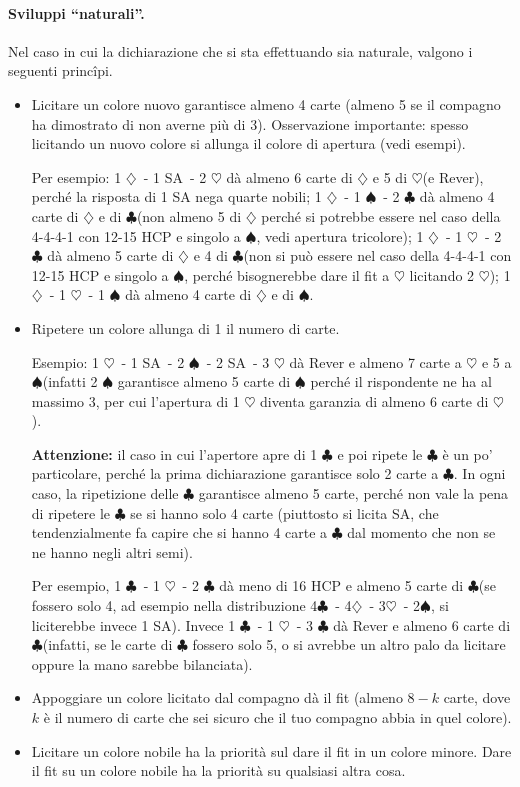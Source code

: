 \documentclass[a4paper,10pt]{article}
\renewcommand{\c}{$\clubsuit$\xspace}
\renewcommand{\d}{$\diamondsuit$\xspace}
\newcommand{\h}{$\heartsuit$\xspace}
\newcommand{\s}{$\spadesuit$\xspace}
\newcommand{\sa}{SA\xspace}
\begin{document}
\paragraph{Sviluppi ``naturali''.}
Nel caso in cui la dichiarazione che si sta effettuando sia naturale, valgono i seguenti princ\^ipi.
\begin{itemize}
 \item Licitare un colore nuovo garantisce almeno 4 carte (almeno 5 se il compagno ha dimostrato di non averne più di 3). Osservazione importante: spesso licitando un nuovo colore si allunga il colore di apertura (vedi esempi).
 
 Per esempio: 1 \d\ - 1 \sa\ - 2 \h dà almeno 6 carte di \d e 5 di \h (e Rever), perché la risposta di 1 \sa nega quarte nobili;
 1 \d\ - 1 \s\ - 2 \c dà almeno 4 carte di \d e di \c (non almeno 5 di \d perché si potrebbe essere nel caso della 4-4-4-1 con 12-15 HCP e singolo a \s, vedi apertura tricolore);
 1 \d\ - 1 \h\ - 2 \c dà almeno 5 carte di \d e 4 di \c (non si può essere nel caso della 4-4-4-1 con 12-15 HCP e singolo a \s, perché bisognerebbe dare il fit a \h licitando 2 \h);
 1 \d\ - 1 \h\ - 1 \s dà almeno 4 carte di \d e di \s.
 
 \item Ripetere un colore allunga di 1 il numero di carte.
 
 Esempio: 1 \h\ - 1 \sa\ - 2 \s\ - 2 \sa\ - 3 \h dà Rever e almeno 7 carte a \h e 5 a \s (infatti 2 \s garantisce almeno 5 carte di \s perché il rispondente ne ha al massimo 3, per cui l'apertura di 1 \h diventa garanzia di almeno 6 carte di \h).
 
 {\bf Attenzione:} il caso in cui l'apertore apre di 1 \c e poi ripete le \c è un po' particolare, perché la prima dichiarazione garantisce solo 2 carte a \c. In ogni caso, la ripetizione delle \c garantisce almeno 5 carte, perché non vale la pena di ripetere le \c se si hanno solo 4 carte (piuttosto si licita \sa, che tendenzialmente fa capire che si hanno 4 carte a \c dal momento che non se ne hanno negli altri semi).
 
 Per esempio, 1 \c\ - 1 \h\ - 2 \c dà meno di 16 HCP e almeno 5 carte di \c (se fossero solo 4, ad esempio nella distribuzione 4\c\ - 4\d\ - 3\h\ - 2\s, si liciterebbe invece 1 \sa).
 Invece 1 \c\ - 1 \h\ - 3 \c dà Rever e almeno 6 carte di \c (infatti, se le carte di \c fossero solo 5, o si avrebbe un altro palo da licitare oppure la mano sarebbe bilanciata).
 
 \item Appoggiare un colore licitato dal compagno dà il fit (almeno $8-k$ carte, dove $k$ è il numero di carte che sei sicuro che il tuo compagno abbia in quel colore).
 \item Licitare un colore nobile ha la priorità sul dare il fit in un colore minore. Dare il fit su un colore nobile ha la priorità su qualsiasi altra cosa.
 

\end{itemize}
\end{document}
